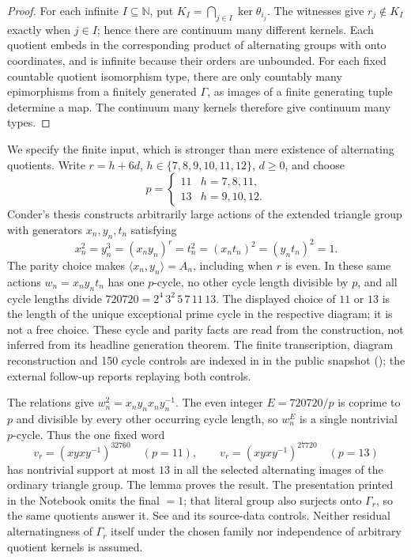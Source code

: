 \begin{proof}
For each infinite \(I\subseteq\mathbb N\), put
\(K_I=\bigcap_{j\in I}\ker\theta_{i_j}\).
The witnesses give \(r_j\notin K_I\) exactly when \(j\in I\);
hence there are continuum many different kernels.
Each quotient embeds in the corresponding product of alternating
groups with onto coordinates, and is infinite because their orders
are unbounded. For each fixed countable quotient isomorphism type,
there are only countably many epimorphisms from a finitely generated
\(\Gamma\), as images of a finite generating tuple determine a map.
The continuum many kernels therefore give continuum many types.
\end{proof}

We specify the finite input, which is stronger than mere existence
of alternating quotients.
Write \(r=h+6d\), \(h\in\{7,8,9,10,11,12\}\), \(d\ge0\), and choose
\[
 p=\begin{cases}11&h=7,8,11,\\13&h=9,10,12.\end{cases}
\]
Conder's thesis \cite[Chapter~5, pp.~117--120]{conder-thesis}
constructs arbitrarily large actions of the extended triangle group
with generators \(x_n,y_n,t_n\) satisfying
\[
 x_n^2=y_n^3=(x_ny_n)^r=t_n^2=(x_nt_n)^2=(y_nt_n)^2=1.
\]
The parity choice makes \(\langle x_n,y_n\rangle=A_n\), including
when \(r\) is even. In these same actions \(w_n=x_ny_nt_n\) has
one \(p\)-cycle, no other cycle length divisible by \(p\), and all
cycle lengths divide \(720720=2^4\,3^2\,5\,7\,11\,13\).
The displayed choice of \(11\) or \(13\) is the length of the unique
exceptional prime cycle in the respective diagram; it is not a free
choice. These cycle and parity facts are read from the construction,
not inferred from its headline generation theorem.
The finite transcription, diagram reconstruction and 150 cycle controls
are indexed in  in the public
snapshot (\reproductionlocation{}); the external follow-up
reports replaying both controls.

The relations give \(w_n^2=x_ny_nx_ny_n^{-1}\).
The even integer \(E=720720/p\) is coprime to \(p\) and divisible
by every other occurring cycle length, so \(w_n^E\) is a single
nontrivial \(p\)-cycle. Thus the one fixed word
\[
 v_r=(xyxy^{-1})^{32760}\quad(p=11),\qquad
 v_r=(xyxy^{-1})^{27720}\quad(p=13)
\]
has nontrivial support at most \(13\) in all the selected alternating
images of the ordinary triangle group.
The lemma proves the result.
The presentation printed in the Notebook omits the final \(=1\);
that literal group also surjects onto \(\Gamma_r\), so the same
quotients answer it.
See  and its source-data controls.
Neither residual alternatingness of \(\Gamma_r\) itself under the
chosen family nor independence of arbitrary quotient kernels is assumed.
